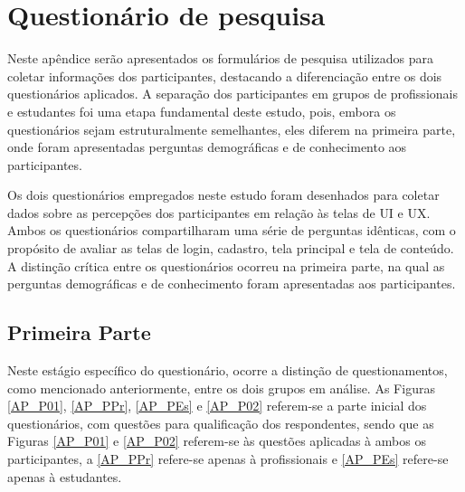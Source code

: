 
 
\chapter{Questionário de pesquisa}\label{questionario_de_pesquisa}

Neste apêndice serão apresentados os formulários de pesquisa utilizados para coletar informações dos participantes, destacando a diferenciação entre os dois questionários aplicados. A separação dos participantes em grupos de profissionais e estudantes foi uma etapa fundamental deste estudo, pois, embora os questionários sejam estruturalmente semelhantes, eles diferem na primeira parte, onde foram apresentadas perguntas demográficas e de conhecimento aos participantes.

Os dois questionários empregados neste estudo foram desenhados para coletar dados sobre as percepções dos participantes em relação às telas de \ac{UI} e \ac{UX}. Ambos os questionários compartilharam uma série de perguntas idênticas, com o propósito de avaliar as telas de login, cadastro, tela principal e tela de conteúdo. A distinção crítica entre os questionários ocorreu na primeira parte, na qual as perguntas demográficas e de conhecimento foram apresentadas aos participantes.

\newpage
\section{Primeira Parte}

Neste estágio específico do questionário, ocorre a distinção de questionamentos, como mencionado anteriormente, entre os dois grupos em análise. As Figuras \ref{AP_P01}, \ref{AP_PPr}, \ref{AP_PEs} e \ref{AP_P02} referem-se a parte inicial dos questionários, com questões para qualificação dos respondentes, sendo que as Figuras \ref{AP_P01} e \ref{AP_P02} referem-se às questões aplicadas à ambos os participantes, a \autoref{AP_PPr} refere-se apenas à profissionais e \autoref{AP_PEs} refere-se apenas à estudantes.

